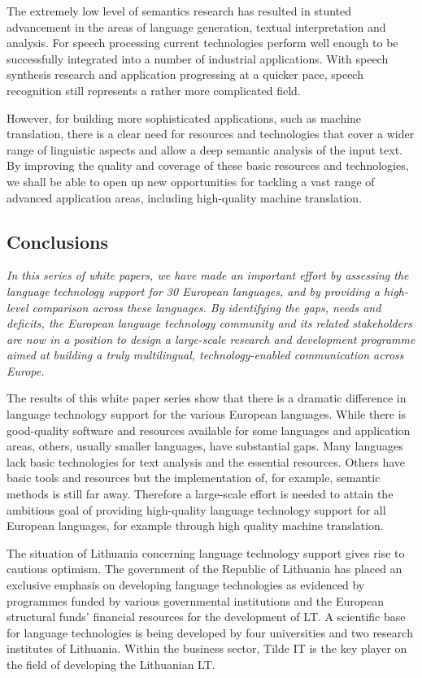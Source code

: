 \documentclass[]{../metanetpaper}
\begin{document}
\begin{multicols}{2}
    The extremely low level of semantics research has resulted in stunted advancement in the areas of language generation, textual interpretation and analysis. For speech processing current technologies perform well enough to be successfully integrated into a number of industrial applications. With speech synthesis research and application progressing at a quicker pace, speech recognition still represents a rather more complicated field.

    However, for building more sophisticated applications, such as machine translation, there is a clear need for resources and technologies that cover a wider range of linguistic aspects and allow a deep semantic analysis of the input text. By improving the quality and coverage of these basic resources and technologies, we shall be able to open up new opportunities for tackling a vast range of advanced application areas, including high-quality machine translation.

\subsection{Conclusions}

\emph{In this series of white papers, we have made an important effort by assessing the language technology support for 30 European languages, and by providing a high-level comparison across these languages. By identifying the gaps, needs and deficits, the European language technology community and its related stakeholders are now in a position to design a large-scale research and development programme aimed at building a truly multilingual, technology-enabled communication across Europe.}

The results of this white paper series show that there is a dramatic difference in language technology support for the various European languages. While there is good-quality software and resources available for some languages and application areas, others, usually smaller languages, have substantial gaps. Many languages lack basic technologies for text analysis and the essential resources. Others have basic tools and resources but the implementation of, for example, semantic methods is still far away. Therefore a large-scale effort is needed to attain the ambitious goal of providing high-quality language technology support for all European languages, for example through high quality machine translation. 

The situation of Lithuania concerning language technology support gives rise to cautious optimism. The government of the Republic of Lithuania has placed an exclusive emphasis on developing language technologies as evidenced by programmes funded by various governmental institutions and the European structural funds’ financial resources for the development of LT. A scientific base for language technologies is being developed by four universities and two research institutes of Lithuania. Within the business sector, Tilde IT is the key player on the field of developing the Lithuanian LT.


\end{multicols}
\end{document}
